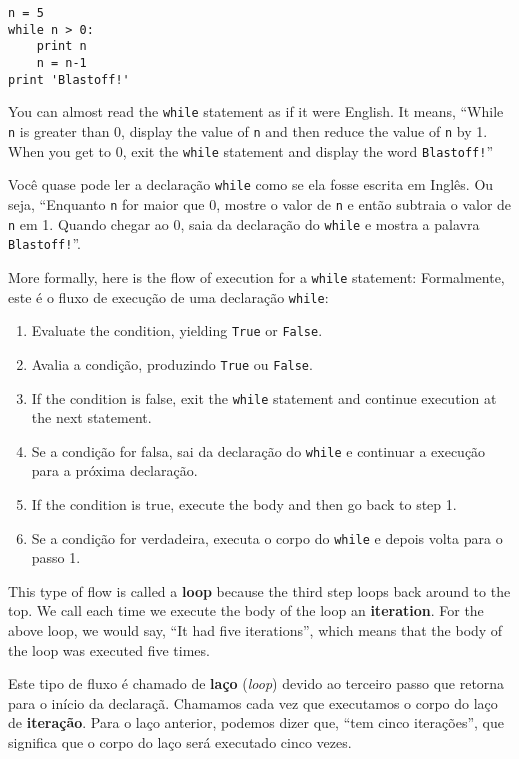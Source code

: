 \beforeverb
\begin{verbatim}
n = 5
while n > 0:
    print n
    n = n-1
print 'Blastoff!'
\end{verbatim}
\afterverb
%
You can almost read the {\tt while} statement as if it were English.
It means, ``While {\tt n} is greater than 0,
display the value of {\tt n} and then reduce the value of
{\tt n} by 1.  When you get to 0, exit the {\tt while} statement and
display the word {\tt Blastoff!}''

%
Você quase pode ler a declaração {\tt while} como se ela fosse escrita em
Inglês. Ou seja, ``Enquanto {\tt n} for maior que 0, mostre o valor de {\tt n}
e então subtraia o valor de {\tt n} em 1. Quando chegar ao 0, saia da
declaração do {\tt while} e mostra a palavra {\tt Blastoff!}''.


More formally, here is the flow of execution for a {\tt while} statement:
Formalmente, este é o fluxo de execução de uma declaração {\tt while}:

\begin{enumerate}

\item Evaluate the condition, yielding {\tt True} or {\tt False}.
\item Avalia a condição, produzindo {\tt True} ou {\tt False}.

\item If the condition is false, exit the {\tt while} statement
and continue execution at the next statement.
\item Se a condição for falsa, sai da declaração do {\tt while} e continuar
	a execução para a próxima declaração.

\item If the condition is true, execute the
body and then go back to step 1.
\item Se a condição for verdadeira, executa o corpo do {\tt while} e depois
	volta para o passo 1.

\end{enumerate}

This type of flow is called a {\bf loop} because the third step
loops back around to the top.  We call each time we execute the body of 
the loop an {\bf iteration}.  For the above loop, we 
would say, ``It had five iterations'', which means that the body of
the loop was executed five times.

Este tipo de fluxo é chamado de {\bf laço} ({\it loop}) devido ao terceiro
passo que retorna para o início da declaraçã. Chamamos cada vez que executamos
o corpo do laço de {\bf iteração}. Para o laço anterior, podemos dizer que,
``tem cinco iterações'', que significa que o corpo do laço será executado
cinco vezes.

